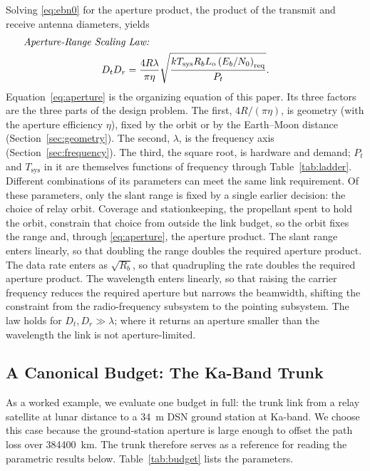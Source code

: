 \documentclass{IEEEoj}
\newcommand{\eqname}[1]{\makebox[\linewidth][l]{\hspace{1em}\textit{#1:}}\notag}
\begin{document}
Solving \eqref{eq:ebn0} for the aperture product, the product of the transmit and receive antenna diameters, yields
\begin{gather}
\eqname{Aperture-Range Scaling Law}\\
D_t D_r = \frac{4 R \lambda}{\pi \eta} \sqrt{\frac{k T_{\mathrm{sys}} R_b L_{\mathrm{o}} \left(E_b/N_0\right)_{\mathrm{req}}}{P_t}}.
\label{eq:aperture}
\end{gather}
Equation~\eqref{eq:aperture} is the organizing equation of this paper. Its three factors are the three parts of the design problem. The first, $4R/(\pi\eta)$, is geometry (with the aperture efficiency $\eta$), fixed by the orbit or by the Earth--Moon distance (Section~\ref{sec:geometry}). The second, $\lambda$, is the frequency axis (Section~\ref{sec:frequency}). The third, the square root, is hardware and demand; $P_t$ and $T_{\mathrm{sys}}$ in it are themselves functions of frequency through Table~\ref{tab:ladder}. Different combinations of its parameters can meet the same link requirement. Of these parameters, only the slant range is fixed by a single earlier decision: the choice of relay orbit. Coverage and stationkeeping, the propellant spent to hold the orbit, constrain that choice from outside the link budget, so the orbit fixes the range and, through \eqref{eq:aperture}, the aperture product. The slant range enters linearly, so that doubling the range doubles the required aperture product. The data rate enters as $\sqrt{R_b}$, so that quadrupling the rate doubles the required aperture product. The wavelength enters linearly, so that raising the carrier frequency reduces the required aperture but narrows the beamwidth, shifting the constraint from the radio-frequency subsystem to the pointing subsystem.
The law holds for $D_t, D_r \gg \lambda$; where it returns an aperture smaller than the wavelength the link is not aperture-limited.

\subsection{A Canonical Budget: The Ka-Band Trunk}
\label{sec:trunk}


As a worked example, we evaluate one budget in full: the trunk link from a relay satellite at lunar distance to a \SI{34}{m} DSN ground station at Ka-band. We choose this case because the ground-station aperture is large enough to offset the path loss over \SI{384400}{km}. The trunk therefore serves as a reference for reading the parametric results below. Table~\ref{tab:budget} lists the parameters.
\end{document}
